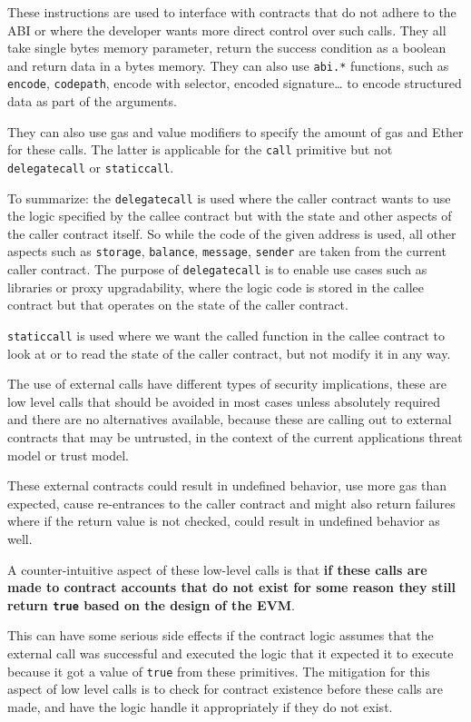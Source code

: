 These instructions are used to interface with contracts that do not
adhere to the ABI or where the developer wants more direct control over
such calls. They all take single bytes memory parameter, return the
success condition as a boolean and return data in a bytes memory. They
can also use \texttt{abi.*} functions, such as \texttt{encode},
\texttt{codepath}, encode with selector, encoded signature\ldots{} to
encode structured data as part of the arguments.

They can also use gas and value modifiers to specify the amount of gas
and Ether for these calls. The latter is applicable for the
\texttt{call} primitive but not \texttt{delegatecall} or
\texttt{staticcall}.

To summarize: the \texttt{delegatecall} is used where the caller
contract wants to use the logic specified by the callee contract but
with the state and other aspects of the caller contract itself. So while
the code of the given address is used, all other aspects such as
\texttt{storage}, \texttt{balance}, \texttt{message}, \texttt{sender}
are taken from the current caller contract. The purpose of
\texttt{delegatecall} is to enable use cases such as libraries or proxy
upgradability, where the logic code is stored in the callee contract but
that operates on the state of the caller contract.

\texttt{staticcall} is used where we want the called function in the
callee contract to look at or to read the state of the caller contract,
but not modify it in any way.

The use of external calls have different types of security implications,
these are low level calls that should be avoided in most cases unless
absolutely required and there are no alternatives available, because
these are calling out to external contracts that may be untrusted, in
the context of the current applications threat model or trust model.

These external contracts could result in undefined behavior, use more
gas than expected, cause re-entrances to the caller contract and might
also return failures where if the return value is not checked, could
result in undefined behavior as well.

A counter-intuitive aspect of these low-level calls is that \textbf{if
these calls are made to contract accounts that do not exist for some
reason they still return \texttt{true} based on the design of the EVM}.

This can have some serious side effects if the contract logic assumes
that the external call was successful and executed the logic that it
expected it to execute because it got a value of \texttt{true} from
these primitives. The mitigation for this aspect of low level calls is
to check for contract existence before these calls are made, and have
the logic handle it appropriately if they do not exist.

